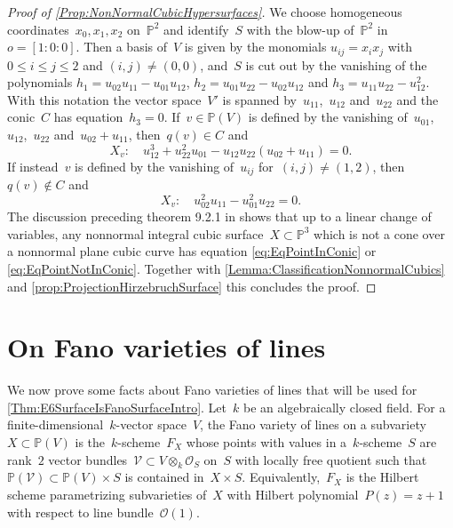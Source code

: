 \documentclass[a4paper]{amsart}
\newcommand{\bbP}{\mathbb{P}}
\newcommand{\cO}{\mathcal{O}}
\newcommand{\cV}{\mathcal{V}}
\renewcommand{\le}{\leqslant}
\theoremstyle{plain}
\theoremstyle{definition}
\numberwithin{equation}{section}
\begin{document}
\begin{proof}[{Proof of \cref{Prop:NonNormalCubicHypersurfaces}}]
We choose homogeneous coordinates~$x_0,x_1,x_2$ on~$\bbP^2$ and identify~$S$ with the blow-up of~$\bbP^2$ in~$o = [1:0:0]$. Then a basis of~$V$ is given by the monomials $u_{ij} = x_i x_j$ with $0 \le i \le j \le 2$ and $(i,j) \neq (0,0)$, and~$S$ is cut out by the vanishing of the polynomials $h_1= u_{02}u_{11} - u_{01}u_{12}$, $h_2 =u_{01}u_{22}- u_{02}u_{12}$ and $ h_3 =u_{11}u_{22}- u_{12}^2$.
With this notation the vector space~$V'$ is spanned by~$u_{11}$,~$u_{12}$ and~$u_{22}$ and the conic~$C$ has equation~$h_3 = 0$. If~$v \in \bbP(V)$ is defined by the vanishing of~$u_{01}$,~$u_{12}$,~$u_{22}$ and~$u_{02} + u_{11}$, then~$q(v) \in C$ and
%
\begin{equation} \label{eq:EqPointInConic} X_v : \quad 
 u_{12}^3 + u_{22}^2 u_{01} - u_{12}u_{22}(u_{02} + u_{11}) 
 = 0.
 \end{equation}
If instead~$v$ is defined by the vanishing of~$u_{ij}$ for~$(i,j) \neq (1,2)$, then~$q(v) \not \in C$ and 
\begin{equation} \label{eq:EqPointNotInConic}
X_v: \quad 
u_{02}^2u_{11} - u_{01}^2u_{22} 
= 0.
\end{equation}
The discussion preceding theorem 9.2.1 in \cite{Dol12} shows that up to a linear change of variables, any nonnormal integral cubic surface~$X \subset \bbP^3$  which is not a cone over a nonnormal plane cubic curve has equation \eqref{eq:EqPointInConic} or \eqref{eq:EqPointNotInConic}. Together with \cref{Lemma:ClassificationNonnormalCubics} and \cref{prop:ProjectionHirzebruchSurface} this concludes the proof.
\end{proof}

\section{On Fano varieties of lines}

We now prove some facts about Fano varieties of lines that will be used for \cref{Thm:E6SurfaceIsFanoSurfaceIntro}. Let~$k$ be an algebraically closed field. For a finite-dimensional~$k$-vector space~$V$, the Fano variety of lines on a subvariety~$X \subset \bbP(V)$ is the~$k$-scheme~$F_X$ whose points with values in a~$k$-scheme~$S$ are rank~$2$ vector bundles~$\cV 
\subset V \otimes_k \cO_S$ on~$S$ with locally free quotient such that~$\bbP(\cV) \subset \bbP(V) \times S$ is contained in~$X \times S$. Equivalently,~$F_X$ is the Hilbert scheme parametrizing subvarieties of~$X$ with Hilbert polynomial~$P(z) = z + 1$ with respect to line bundle~$\cO(1)$. 
\end{document}
